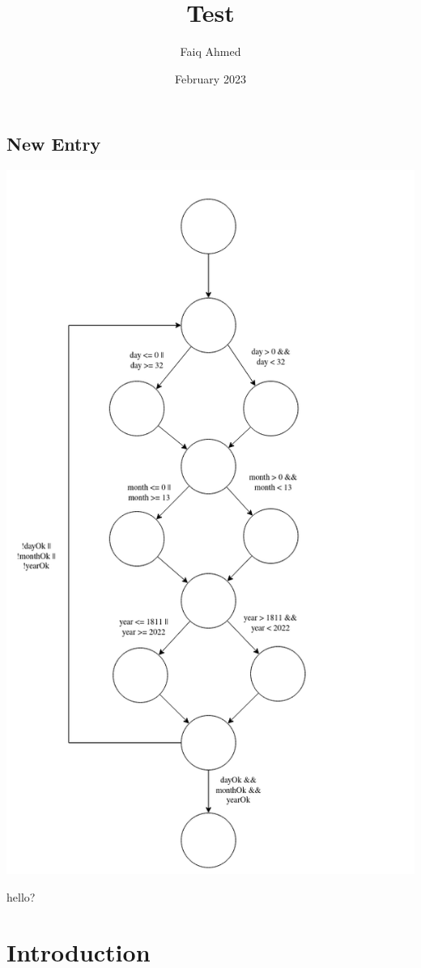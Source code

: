\documentclass{article}
\title{Test}
\author{Faiq Ahmed}
\date{February 2023}
\begin{document}
\maketitle
\subsection{New Entry}
\includegraphics[width=\linewidth]{Q2a.png}

hello?

\section{Introduction}
\end{document}

